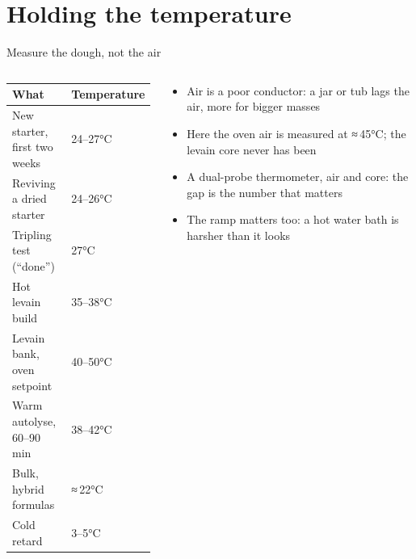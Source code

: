 \documentclass[aspectratio=169,11pt]{beamer}
\newcommand{\tablesetup}{\renewcommand{\arraystretch}{1.2}\setlength{\tabcolsep}{4pt}}
\newenvironment{tablebox}[1][\footnotesize]{\par\tablesetup#1}{\par}
\begin{document}
\section{Holding the temperature}

\begin{frame}{Measure the dough, not the air}
  \begin{columns}[T,onlytextwidth]
    \begin{column}{0.52\textwidth}
      \begin{tablebox}[\scriptsize]
      \begin{tabularx}{\linewidth}{@{}Y l@{}}
        \toprule
        What & Temperature \\
        \midrule
        New starter, first two weeks & 24--27°C \\
        Reviving a dried starter & 24--26°C \\
        Tripling test (``done'') & 27°C \\
        Hot levain build & 35--38°C \\
        Levain bank, oven setpoint & 40--50°C \\
        Warm autolyse, 60--90 min & 38--42°C \\
        Bulk, hybrid formulas & ≈\,22°C \\
        Cold retard & 3--5°C \\
        \bottomrule
      \end{tabularx}
      \end{tablebox}
    \end{column}
    \begin{column}{0.44\textwidth}
      \small
      \begin{itemize}\setlength{\itemsep}{1pt}
        \item Air is a poor conductor: a jar or tub lags the air, more for bigger masses
        \item Here the oven air is measured at ≈\,45°C; the levain core never has been
        \item A dual-probe thermometer, air and core: the gap is the number that matters
        \item The ramp matters too: a hot water bath is harsher than it looks
      \end{itemize}
    \end{column}
  \end{columns}
\end{frame}
\end{document}
